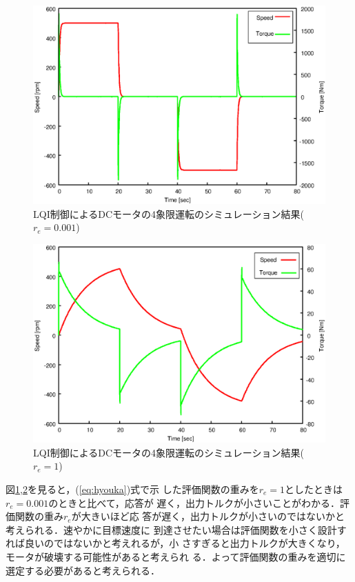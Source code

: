 \documentclass[a4paper,12pt]{jarticle}
\begin{document}
\begin{figure}[b]
 \begin{center}
  \includegraphics[width = 150mm]{fig/LQI_r0001.eps}
 \end{center}
 \caption{LQI制御によるDCモータの4象限運転のシミュレーション結果($r_e=0.001$)}
 \label{fig:LQI_r0001}
\end{figure}
%
%
\begin{figure}[htbp]
 \begin{center}
  \includegraphics[width = 150mm]{fig/LQI_r1.eps}
 \end{center}
 \caption{LQI制御によるDCモータの4象限運転のシミュレーション結果($r_e=1$)}
 \label{fig:LQI_r1}
\end{figure}
%
%
図\ref{fig:LQI_r0001},\ref{fig:LQI_r1}を見ると，(\ref{eq:hyouka})式で示
した評価関数の重みを$r_e=1$としたときは$r_e=0.001$のときと比べて，応答が
遅く，出力トルクが小さいことがわかる．評価関数の重み$r_e$が大きいほど応
答が遅く，出力トルクが小さいのではないかと考えられる．速やかに目標速度に
到達させたい場合は評価関数を小さく設計すれば良いのではないかと考えれるが，小
さすぎると出力トルクが大きくなり，モータが破壊する可能性があると考えられ
る．よって評価関数の重みを適切に選定する必要があると考えられる．
%
\end{document}
